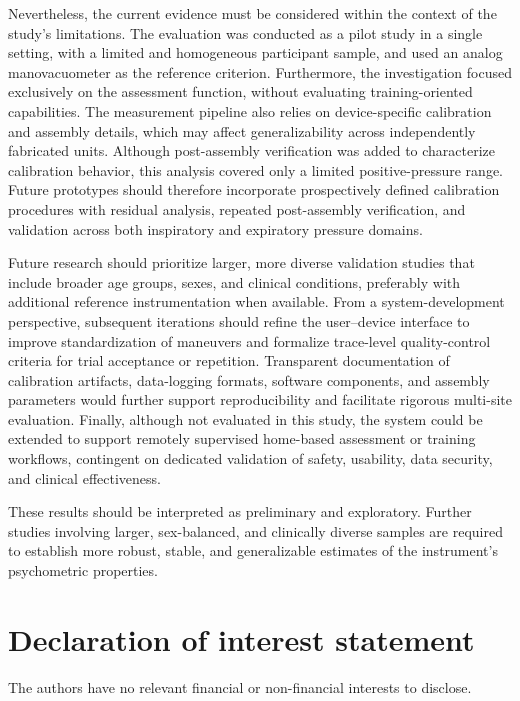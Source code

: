 \documentclass{ieeeaccess}
\begin{document}
{Nevertheless, the current evidence must be considered within the context of the study's limitations. The evaluation was conducted as a pilot study in a single setting, with a limited and homogeneous participant sample, and used an analog manovacuometer as the reference criterion. Furthermore, the investigation focused exclusively on the assessment function, without evaluating training-oriented capabilities. The measurement pipeline also relies on device-specific calibration and assembly details, which may affect generalizability across independently fabricated units. {Although post-assembly verification was added to characterize calibration behavior, this analysis covered only a limited positive-pressure range. Future prototypes should therefore incorporate prospectively defined calibration procedures with residual analysis, repeated post-assembly verification, and validation across both inspiratory and expiratory pressure domains.}

{Future research should prioritize larger, more diverse validation studies that include broader age groups, sexes, and clinical conditions, preferably with additional reference instrumentation when available. From a system-development perspective, subsequent iterations should refine the user--device interface to improve standardization of maneuvers and formalize trace-level quality-control criteria for trial acceptance or repetition. Transparent documentation of calibration artifacts, data-logging formats, software components, and assembly parameters would further support reproducibility and facilitate rigorous multi-site evaluation. Finally, although not evaluated in this study, the system could be extended to support remotely supervised home-based assessment or training workflows, contingent on dedicated validation of safety, usability, data security, and clinical effectiveness.}

{These results should be interpreted as preliminary and exploratory. Further studies involving larger, sex-balanced, and clinically diverse samples are required to establish more robust, stable, and generalizable estimates of the instrument’s psychometric properties.}

\section*{Declaration of interest statement}

The authors have no relevant financial or non-financial interests to disclose.

}
\end{document}
